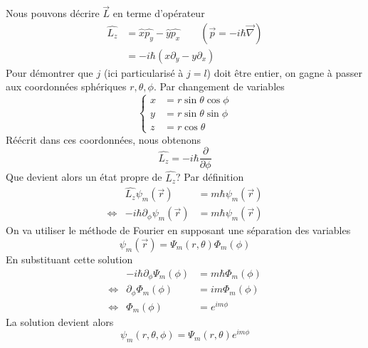 	Nous pouvons décrire $\vec{L}$ en terme d'opérateur
	\begin{equation}
	\begin{array}{ll}
	\hat{L_z} &= \hat{x}\hat{p_y}-\hat{y}\hat{p_x}\qquad (\vec{p} = -i\hbar\vec{\nabla})\\
	&= -i\hbar(x\partial_y - y\partial_x)
	\end{array}
	\end{equation}
	Pour démontrer que $j$ (ici particularisé à $j=l$) doit être entier, on gagne à passer aux 
	coordonnées sphériques $r,\theta,\phi$. Par changement de variables
	\begin{equation}
	\left\{\begin{array}{ll}
	x &= r\sin\theta\cos\phi\\
	y &= r\sin\theta\sin\phi\\
	z &= r\cos\theta
	\end{array}\right. 
	\end{equation}
	Réécrit dans ces coordonnées, nous obtenons
	\begin{equation}
	\hat{L_z} = -i\hbar\dfrac{\partial}{\partial\phi}
	\end{equation}
	Que devient alors un état propre de $\hat{L_z}$? Par définition 
	\begin{equation}
	\begin{array}{lll}
	& \hat{L_z}\psi_m(\vec{r}) &= m\hbar\psi_m(\vec{r})\\
	\Leftrightarrow& -i\hbar \partial_\phi \psi_m(\vec{r}) &= m\hbar\psi_m(\vec{r})
	\end{array}
	\end{equation}
	On va utiliser le méthode de Fourier en supposant une séparation des 
	variables
	\begin{equation}
	\psi_m(\vec{r}) = \Psi_m(r,\theta)\Phi_m(\phi)
	\end{equation}
	En substituant cette solution
	\begin{equation}
	\begin{array}{lll}
	& -i\hbar\partial_\phi \Psi_m(\phi) &= m\hbar\Phi_m(\phi)\\
	\Leftrightarrow& \partial_\phi \Phi_m(\phi) &= im\Phi_m(\phi)\\
	\Leftrightarrow& \Phi_m(\phi) &= e^{im\phi}
	\end{array}
	\end{equation}
	La solution devient alors
	\begin{equation}
	\psi_m(r,\theta,\phi) = \Psi_m(r,\theta)e^{im\phi}
	\end{equation}
